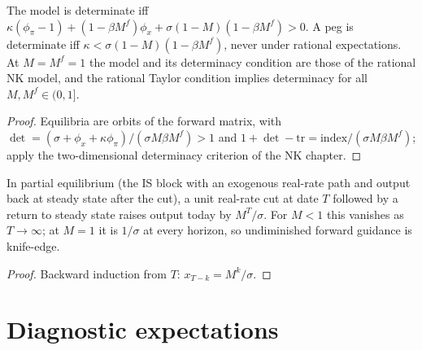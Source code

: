 \begin{theorem}
\label{thm:bm-cnk-det}
\leanok
The model is determinate iff $\kappa(\phi_\pi-1)+(1-\beta M^f)\phi_x+\sigma(1-M)(1-\beta M^f)>0$. A peg is determinate
iff $\kappa<\sigma(1-M)(1-\beta M^f)$, never under rational expectations. At $M=M^f=1$ the model and its determinacy
condition are those of the rational NK model, and the rational Taylor condition implies determinacy for all
$M,M^f\in(0,1]$.
\end{theorem}
\begin{proof}
\leanok
Equilibria are orbits of the forward matrix, with $\det=(\sigma+\phi_x+\kappa\phi_\pi)/(\sigma M\beta M^f)>1$ and
$1+\det-\mathrm{tr}=\text{index}/(\sigma M\beta M^f)$; apply the two-dimensional determinacy criterion of the NK chapter.
\end{proof}

\begin{theorem}
\label{thm:bm-fg}
\leanok
In partial equilibrium (the IS block with an exogenous real-rate path and output back at steady state after the cut), a unit real-rate cut at date $T$ followed by a return to steady state raises output today by $M^T/\sigma$.
For $M<1$ this vanishes as $T\to\infty$; at $M=1$ it is $1/\sigma$ at every horizon, so undiminished forward guidance
is knife-edge.
\end{theorem}
\begin{proof}
\leanok
Backward induction from $T$: $x_{T-k}=M^k/\sigma$.
\end{proof}

\section{Diagnostic expectations}

